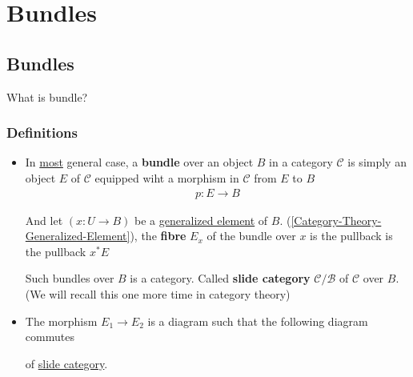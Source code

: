 \documentclass[Total.tex]{subfiles}
\begin{document}
	
	\chapter{Bundles}
	
	\section{Bundles}
	What is bundle?
	
	\subsection{Definitions}
	
	\begin{Def}
		\begin{itemize}
			\item In \underline{most} general case, a \textbf{bundle} over an object $B$ in a category $\mathcal{C}$ is simply an object $E$ of $\mathcal{C}$ equipped wiht a morphism in $\mathcal{C}$ from $E$ to $B$
			\begin{gather*}
				p:E\rightarrow B
			\end{gather*}
			
			And let $(x:U\rightarrow B)$ be a \underline{generalized element} of $B$. (\ref{Category-Theory-Generalized-Element}), the \textbf{fibre} $E_x$ of the bundle over $x$ is the pullback is the pullback $x^*E$
			\begin{center}
			\end{center}
			
			Such bundles over $B$ is a category. Called \textbf{slide category} $\mathcal{C}/\mathcal{B}$ of $\mathcal{C}$ over $B$.(We will recall this one more time in category theory)
			\item The morphism $E_1\rightarrow E_2$ is a diagram such that the following diagram commutes
			\begin{center}
			\end{center}
			
			of \underline{slide category}.
		\end{itemize}
	\end{Def}
	
\end{document}
